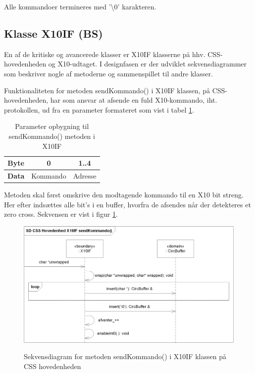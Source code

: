 Alle kommandoer termineres med '\textbackslash 0' karakteren. 

\subsection{Klasse X10IF (BS)}
En af de kritiske og avancerede klasser er X10IF klasserne på hhv. CSS-hovedenheden og X10-udtaget. I designfasen er der udviklet sekvensdiagrammer som beskriver nogle af metoderne og sammenspillet til andre klasser.

Funktionaliteten for metoden sendKommando() i X10IF klassen, på CSS-hovedenheden, har som ansvar at afsende en fuld X10-kommando, iht. protokollen, ud fra en parameter formateret som vist i tabel \ref{table:X10_sendKommando_format}.

\begin{table}[h]
	\caption{Parameter opbygning til sendKommando() metoden i X10IF}
	\centering
	\begin{tabular}{|c|c|c|}
		\hline 
		\textbf{Byte} & 0 & 1..4 \\ \hline
		\textbf{Data} & Kommando & Adresse \\ 
		\hline 
	\end{tabular} 
	\label{table:X10_sendKommando_format}
\end{table}

Metoden skal først omskrive den modtagende kommando til en X10 bit streng. Her efter indsættes alle bit's i en buffer, hvorfra de afsendes når der detekteres et zero cross. 
Sekvensen er vist i figur \ref{fig:X10_sendKommando_sd}.

\begin{figure}[!htb]
     {\includegraphics[width=\textwidth]{billeder/uml/CSS_X10IF_sendKommando_SD}}
     \caption{Sekvensdiagram for metoden sendKommando() i X10IF klassen på CSS hovedenheden}
     \label{fig:X10_sendKommando_sd}
\end{figure}

